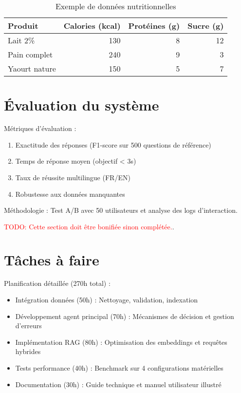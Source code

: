 \documentclass[a4paper,11pt]{article}
\begin{document}
\begin{table}[ht]
\centering
\caption{Exemple de données nutritionnelles}
\begin{tabular}{lrrr}
\toprule
Produit & Calories (kcal) & Protéines (g) & Sucre (g) \\
\midrule
Lait 2\% & 130 & 8 & 12 \\
Pain complet & 240 & 9 & 3 \\
Yaourt nature & 150 & 5 & 7 \\
\bottomrule
\end{tabular}
\end{table}

\section{Évaluation du système}
\label{sec:evaluation}
Métriques d'évaluation :

\begin{enumerate}
    \item Exactitude des réponses (F1-score sur 500 questions de référence)
    \item Temps de réponse moyen (objectif < 3s)
    \item Taux de réussite multilingue (FR/EN)
    \item Robustesse aux données manquantes
\end{enumerate}

Méthodologie : Test A/B avec 50 utilisateurs et analyse des logs d'interaction.

\textcolor{red}{TODO: Cette section doit être bonifiée sinon complétée.}.


\section{Tâches à faire}
\label{sec:taches}
Planification détaillée (270h total) :

\begin{itemize}
    \item Intégration données (50h) : Nettoyage, validation, indexation
    \item Développement agent principal (70h) : Mécanismes de décision et gestion d'erreurs
    \item Implémentation RAG (80h) : Optimisation des embeddings et requêtes hybrides
    \item Tests performance (40h) : Benchmark sur 4 configurations matérielles
    \item Documentation (30h) : Guide technique et manuel utilisateur illustré
\end{itemize}
\end{document}
